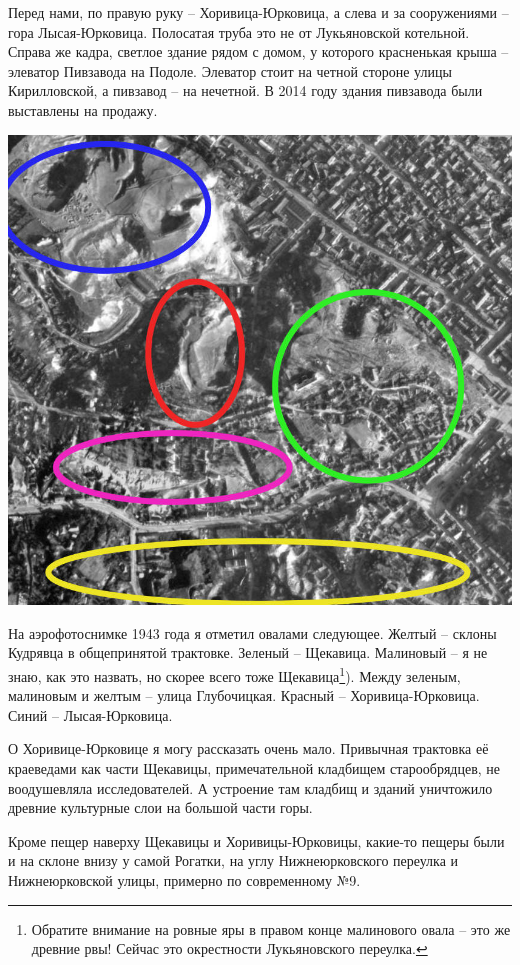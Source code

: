 Перед нами, по правую руку – Хоривица-Юрковица, а слева и за сооружениями – гора Лысая-Юрковица. Полосатая труба это не от Лукьяновской котельной. Справа же кадра, светлое здание рядом с домом, у которого красненькая крыша – элеватор Пивзавода на Подоле. Элеватор стоит на четной стороне улицы Кирилловской, а пивзавод – на нечетной. В 2014 году здания пивзавода были выставлены на продажу.

\begin{center}
\includegraphics[width=\linewidth]{chast-kirvys/yourk/y.jpg}
\end{center} 

На аэрофотоснимке 1943 года я отметил овалами следующее. Желтый – склоны Кудрявца в общепринятой трактовке. Зеленый – Щекавица. Малиновый – я не знаю, как это назвать, но скорее всего тоже Щекавица\footnote{Обратите внимание на ровные яры в правом конце малинового овала – это же древние рвы! Сейчас это окрестности Лукьяновского переулка.}). Между зеленым, малиновым и желтым – улица Глубочицкая. Красный – Хоривица-Юрковица. Синий – Лысая-Юрковица.

О Хоривице-Юрковице я могу рассказать очень мало. Привычная трактовка её краеведами как части Щекавицы, примечательной кладбищем старообрядцев, не воодушевляла исследователей. А устроение там кладбищ и зданий уничтожило древние культурные слои на большой части горы.

Кроме пещер наверху Щекавицы и Хоривицы-Юрко\-вицы, какие-то пещеры были и на склоне внизу у самой Рогатки, на углу Нижнеюрковского переулка и Нижнеюрковской улицы, примерно по современному №9.

